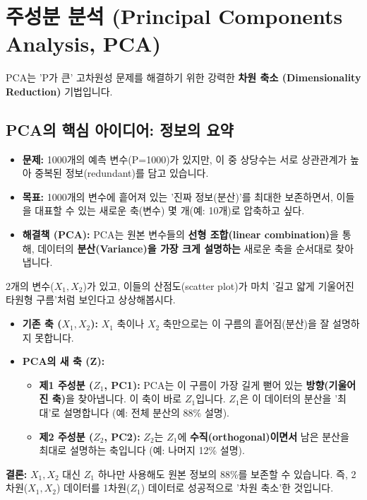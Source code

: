 \documentclass[11pt,a4paper]{book}
\theoremstyle{definition}
\begin{document}
\section{주성분 분석 (Principal Components Analysis, PCA)}

PCA는 'P가 큰' 고차원성 문제를 해결하기 위한 강력한 \textbf{차원 축소 (Dimensionality Reduction)} 기법입니다.

\subsection{PCA의 핵심 아이디어: 정보의 요약}
\begin{itemize}
    \item \textbf{문제:} 1000개의 예측 변수(P=1000)가 있지만, 이 중 상당수는 서로 상관관계가 높아 중복된 정보(redundant)를 담고 있습니다.
    \item \textbf{목표:} 1000개의 변수에 흩어져 있는 '진짜 정보(분산)'를 최대한 보존하면서, 이들을 대표할 수 있는 새로운 축(변수) 몇 개(예: 10개)로 압축하고 싶다.
    \item \textbf{해결책 (PCA):} PCA는 원본 변수들의 \textbf{선형 조합(linear combination)}을 통해, 데이터의 \textbf{분산(Variance)을 가장 크게 설명하는} 새로운 축을 순서대로 찾아냅니다.
\end{itemize}

\begin{analogybox}[title={PCA: 데이터 구름의 '최적의 축' 찾기}]
2개의 변수($X_1, X_2$)가 있고, 이들의 산점도(scatter plot)가 마치 '길고 얇게 기울어진 타원형 구름'처럼 보인다고 상상해봅시다.

\begin{itemize}
    \item \textbf{기존 축 ($X_1, X_2$):} $X_1$ 축이나 $X_2$ 축만으로는 이 구름의 흩어짐(분산)을 잘 설명하지 못합니다.
    \item \textbf{PCA의 새 축 (Z):}
        \begin{itemize}
            \item \textbf{제1 주성분 ($Z_1$, PC1):} PCA는 이 구름이 가장 길게 뻗어 있는 \textbf{방향(기울어진 축)}을 찾아냅니다. 이 축이 바로 $Z_1$입니다. $Z_1$은 이 데이터의 분산을 '최대'로 설명합니다 (예: 전체 분산의 88\% 설명).
            \item \textbf{제2 주성분 ($Z_2$, PC2):} $Z_2$는 $Z_1$에 \textbf{수직(orthogonal)이면서} 남은 분산을 최대로 설명하는 축입니다 (예: 나머지 12\% 설명).
        \end{itemize}
\end{itemize}
\textbf{결론:} $X_1, X_2$ 대신 $Z_1$ 하나만 사용해도 원본 정보의 88\%를 보존할 수 있습니다. 즉, 2차원($X_1, X_2$) 데이터를 1차원($Z_1$) 데이터로 성공적으로 '차원 축소'한 것입니다.
\end{analogybox}
\end{document}
